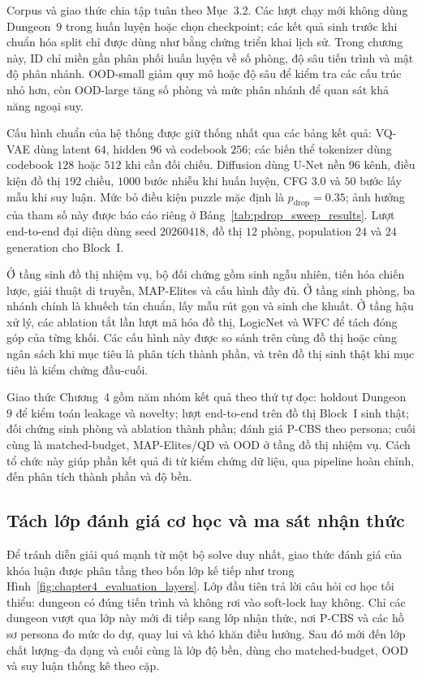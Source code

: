 \documentclass[oneside,a4paper,12pt]{extreport}
\begin{document}
Corpus và giao thức chia tập tuân theo Mục~3.2. Các lượt chạy mới không dùng Dungeon~$9$ trong huấn luyện hoặc chọn checkpoint; các kết quả sinh trước khi chuẩn hóa split chỉ được dùng như bằng chứng triển khai lịch sử. Trong chương này, ID chỉ miền gần phân phối huấn luyện về số phòng, độ sâu tiến trình và mật độ phân nhánh. OOD-small giảm quy mô hoặc độ sâu để kiểm tra các cấu trúc nhỏ hơn, còn OOD-large tăng số phòng và mức phân nhánh để quan sát khả năng ngoại suy.

Cấu hình chuẩn của hệ thống được giữ thống nhất qua các bảng kết quả: VQ-VAE dùng latent $64$, hidden $96$ và codebook $256$; các biến thể tokenizer dùng codebook $128$ hoặc $512$ khi cần đối chiếu. Diffusion dùng U-Net nền $96$ kênh, điều kiện đồ thị $192$ chiều, $1000$ bước nhiễu khi huấn luyện, CFG $3.0$ và $50$ bước lấy mẫu khi suy luận. Mức bỏ điều kiện puzzle mặc định là $p_{\text{drop}}=0.35$; ảnh hưởng của tham số này được báo cáo riêng ở Bảng~\ref{tab:pdrop_sweep_results}. Lượt end-to-end đại diện dùng seed $20260418$, đồ thị $12$ phòng, population $24$ và $24$ generation cho Block~I.

Ở tầng sinh đồ thị nhiệm vụ, bộ đối chứng gồm sinh ngẫu nhiên, tiến hóa chiến lược, giải thuật di truyền, MAP-Elites và cấu hình đầy đủ. Ở tầng sinh phòng, ba nhánh chính là khuếch tán chuẩn, lấy mẫu rút gọn và sinh che khuất. Ở tầng hậu xử lý, các ablation tắt lần lượt mã hóa đồ thị, LogicNet và WFC để tách đóng góp của từng khối. Các cấu hình này được so sánh trên cùng đồ thị hoặc cùng ngân sách khi mục tiêu là phân tích thành phần, và trên đồ thị sinh thật khi mục tiêu là kiểm chứng đầu-cuối.

Giao thức Chương~4 gồm năm nhóm kết quả theo thứ tự đọc: holdout Dungeon~$9$ để kiểm toán leakage và novelty; lượt end-to-end trên đồ thị Block~I sinh thật; đối chứng sinh phòng và ablation thành phần; đánh giá P-CBS theo persona; cuối cùng là matched-budget, MAP-Elites/QD và OOD ở tầng đồ thị nhiệm vụ. Cách tổ chức này giúp phần kết quả đi từ kiểm chứng dữ liệu, qua pipeline hoàn chỉnh, đến phân tích thành phần và độ bền.

\subsection{Tách lớp đánh giá cơ học và ma sát nhận thức}
Để tránh diễn giải quá mạnh từ một bộ solve duy nhất, giao thức đánh giá của khóa luận được phân tầng theo bốn lớp kế tiếp như trong Hình~\ref{fig:chapter4_evaluation_layers}. Lớp đầu tiên trả lời câu hỏi cơ học tối thiểu: dungeon có đúng tiến trình và không rơi vào soft-lock hay không. Chỉ các dungeon vượt qua lớp này mới đi tiếp sang lớp nhận thức, nơi P-CBS và các hồ sơ persona đo mức do dự, quay lui và khó khăn điều hướng. Sau đó mới đến lớp chất lượng--đa dạng và cuối cùng là lớp độ bền, dùng cho matched-budget, OOD và suy luận thống kê theo cặp.
\end{document}
